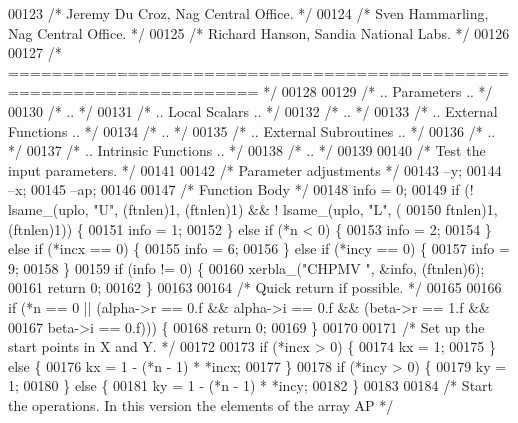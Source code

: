 \begin{DoxyCode}
00123 \textcolor{comment}{/*     Jeremy Du Croz, Nag Central Office. */}
00124 \textcolor{comment}{/*     Sven Hammarling, Nag Central Office. */}
00125 \textcolor{comment}{/*     Richard Hanson, Sandia National Labs. */}
00126 
00127 \textcolor{comment}{/*  ===================================================================== */}
00128 
00129 \textcolor{comment}{/*     .. Parameters .. */}
00130 \textcolor{comment}{/*     .. */}
00131 \textcolor{comment}{/*     .. Local Scalars .. */}
00132 \textcolor{comment}{/*     .. */}
00133 \textcolor{comment}{/*     .. External Functions .. */}
00134 \textcolor{comment}{/*     .. */}
00135 \textcolor{comment}{/*     .. External Subroutines .. */}
00136 \textcolor{comment}{/*     .. */}
00137 \textcolor{comment}{/*     .. Intrinsic Functions .. */}
00138 \textcolor{comment}{/*     .. */}
00139 
00140 \textcolor{comment}{/*     Test the input parameters. */}
00141 
00142     \textcolor{comment}{/* Parameter adjustments */}
00143     --y;
00144     --x;
00145     --ap;
00146 
00147     \textcolor{comment}{/* Function Body */}
00148     info = 0;
00149     \textcolor{keywordflow}{if} (! lsame\_(uplo, \textcolor{stringliteral}{"U"}, (ftnlen)1, (ftnlen)1) && ! lsame\_(uplo, \textcolor{stringliteral}{"L"}, (
00150         ftnlen)1, (ftnlen)1)) \{
00151     info = 1;
00152     \} \textcolor{keywordflow}{else} \textcolor{keywordflow}{if} (*n < 0) \{
00153     info = 2;
00154     \} \textcolor{keywordflow}{else} \textcolor{keywordflow}{if} (*incx == 0) \{
00155     info = 6;
00156     \} \textcolor{keywordflow}{else} \textcolor{keywordflow}{if} (*incy == 0) \{
00157     info = 9;
00158     \}
00159     \textcolor{keywordflow}{if} (info != 0) \{
00160     xerbla\_(\textcolor{stringliteral}{"CHPMV "}, &info, (ftnlen)6);
00161     \textcolor{keywordflow}{return} 0;
00162     \}
00163 
00164 \textcolor{comment}{/*     Quick return if possible. */}
00165 
00166     \textcolor{keywordflow}{if} (*n == 0 || (alpha->r == 0.f && alpha->i == 0.f && (beta->r == 1.f && 
00167                                                            beta->i == 0.f))) \{
00168     \textcolor{keywordflow}{return} 0;
00169     \}
00170 
00171 \textcolor{comment}{/*     Set up the start points in  X  and  Y. */}
00172 
00173     \textcolor{keywordflow}{if} (*incx > 0) \{
00174     kx = 1;
00175     \} \textcolor{keywordflow}{else} \{
00176     kx = 1 - (*n - 1) * *incx;
00177     \}
00178     \textcolor{keywordflow}{if} (*incy > 0) \{
00179     ky = 1;
00180     \} \textcolor{keywordflow}{else} \{
00181     ky = 1 - (*n - 1) * *incy;
00182     \}
00183 
00184 \textcolor{comment}{/*     Start the operations. In this version the elements of the array AP */}

\end{DoxyCode}
